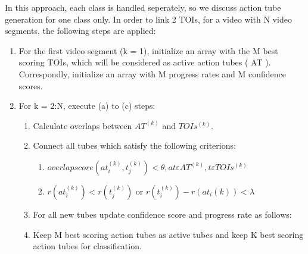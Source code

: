 \documentclass{report}
\begin{document}
In this approach, each class is handled seperately, so we discuss action tube generation for one class only. In order to link 2 TOIs, for
a video with N video segments, the following steps are applied:
\begin{enumerate}
\item For the first video segment (k = 1), initialize an array with the M best scoring TOIs, which will be considered as active action tubes ( AT ).
  Correspondly, initialize an array with M progress rates  and M confidence scores.
\item For k = 2:N, execute (a) to (c) steps:
  \begin{enumerate}
  \item Calculate overlaps between $ AT^{(k)} $ and $ TOIs^{(k)}. $
  \item Connect all tubes which satisfy the following criterions:
    \begin{enumerate}
    \item $ overlap score(at_i^{(k)},t_j^{(k)})   < \theta, 
      at  \varepsilon AT^{(k)}, t \varepsilon TOIs^{(k)}  $
    \item $r(at_i^{(k)}) < r(t_j^{(k)}) $ or 
      $r(t_i^{(k)}) - r(at_i{(k)}) < \lambda $
    \end{enumerate}
    
  \item For all new tubes update confidence score and progress rate as follows:
  \item Keep M best scoring action tubes as active tubes and keep K best scoring action tubes for classification.
  \end{enumerate}
  
\end{enumerate}
\end{document}
